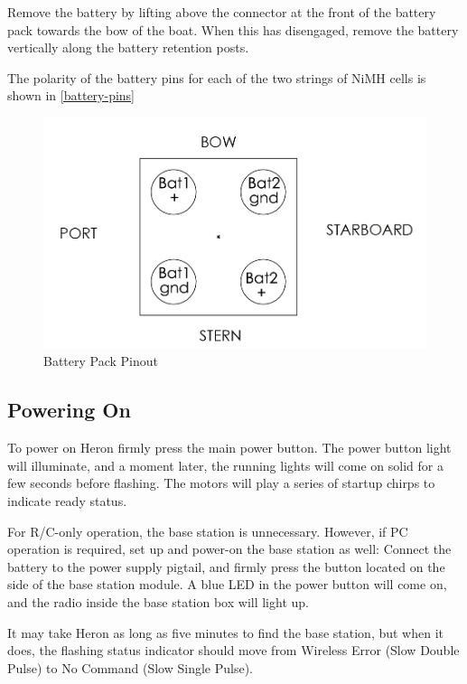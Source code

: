 \documentclass[]{clearpath-latex/clearpath-manual}
\begin{document}
\begin{warning}
Remove the battery by lifting above the connector at the front of the battery pack towards the bow of the boat. When this has disengaged, remove the battery vertically along the battery retention posts. 
\end{warning}

The polarity of the battery pins for each of the two strings of NiMH cells is shown in \autoref{battery-pins}

\begin{figure}[h]
  \centering
  \includegraphics[width=0.75\linewidth]{h-battery-pins.png}
  \caption{Battery Pack Pinout}
  \label{battery-pins}
\end{figure}



\newpage

\subsection{Powering On}
To power on Heron firmly press the main power button. The power button light will illuminate, and a moment later, the running lights will come on solid for a few seconds before flashing. The motors will play a series of startup chirps to indicate ready status.

For R/C-only operation, the base station is unnecessary. However, if PC operation is required, set up and power-on the base station as well: Connect the battery to the power supply pigtail, and firmly press the button located on the side of the base station module. A blue LED in the power button will come on, and the radio inside the base station box will light up.

It may take Heron as long as five minutes to find the base station, but when it does, the flashing status indicator should move from Wireless Error (Slow Double Pulse) to No Command (Slow Single Pulse).
\end{document}
